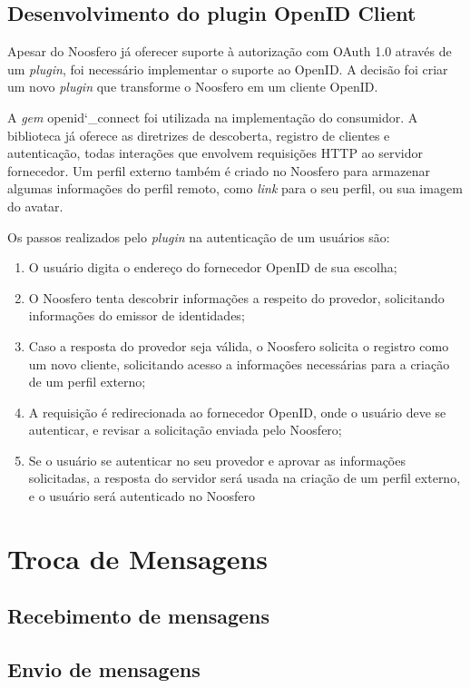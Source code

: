 \subsection{Desenvolvimento do plugin OpenID Client}

Apesar do Noosfero já oferecer suporte à autorização com OAuth 1.0 através de um
\textit{plugin}, foi necessário implementar o suporte ao OpenID. A decisão foi criar
um novo \textit{plugin} que transforme o Noosfero em um cliente OpenID.

A \textit{gem} openid\char`_connect foi utilizada na implementação do consumidor. A
biblioteca já oferece as diretrizes de descoberta, registro de clientes e
autenticação, todas interações que envolvem requisições HTTP ao servidor fornecedor.
Um perfil externo também é criado no Noosfero para armazenar algumas informações do
perfil remoto, como \textit{link} para o seu perfil, ou sua imagem do avatar.

Os passos realizados pelo \textit{plugin} na autenticação de um usuários são:

\begin{enumerate}
  \item{O usuário digita o endereço do fornecedor OpenID de sua escolha;}
  \item{O Noosfero tenta descobrir informações a respeito do provedor, solicitando
        informações do emissor de identidades;}
  \item{Caso a resposta do provedor seja válida, o Noosfero solicita o registro como
        um novo cliente, solicitando acesso a informações necessárias para a criação
        de um perfil externo;}
  \item{A requisição é redirecionada ao fornecedor OpenID, onde o usuário deve se
        autenticar, e revisar a solicitação enviada pelo Noosfero;}
  \item{Se o usuário se autenticar no seu provedor e aprovar as informações
        solicitadas, a resposta do servidor será usada na criação de um perfil
        externo, e o usuário será autenticado no Noosfero}
\end{enumerate}

\section{Troca de Mensagens}



\subsection{Recebimento de mensagens}



\subsection{Envio de mensagens}

